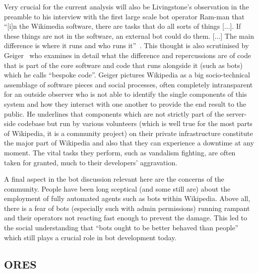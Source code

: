 Very crucial for the current analysis will also be Livingstone's observation in the preamble to his interview with the first large scale bot operator Ram-man that
``[i]n the Wikimedia software, there are tasks that do all sorts of things [...].
If these things are not in the software, an external bot could do them. [...]
The main difference is where it runs and who runs it''~\cite{Livingstone2016}.
This thought is also scrutinised by Geiger~\cite{Geiger2014} who examines in detail what the difference and repercussions are of code that is part of the core software and code that runs alongside it (such as bots) which he calls ``bespoke code''.
Geiger pictures Wikipedia as a big socio-technical assemblage of software pieces and social processes, often completely intransparent for an outside observer who is not able to identify the single components of this system and how they interact with one another to provide the end result to the public.
He underlines that components which are not strictly part of the server-side codebase but run by various volunteers (which is well true for the most parts of Wikipedia, it is a community project) on their private infrastructure constitute the major part of Wikipedia and also that they can experience a downtime at any moment. %
The vital tasks they perform, such as vandalism fighting, are often taken for granted, much to their developers' aggravation.

A final aspect in the bot discussion relevant here are the concerns of the community.
People have been long sceptical (and some still are) about the employment of fully automated agents such as bots within Wikipedia.
Above all, there is a fear of bots (especially such with admin permissions) running rampant and their operators not reacting fast enough to prevent the damage.
This led to the social understanding that ``bots ought to be better behaved than people''~\cite{Geiger2011} which still plays a crucial role in bot development today.

\subsection{ORES}

